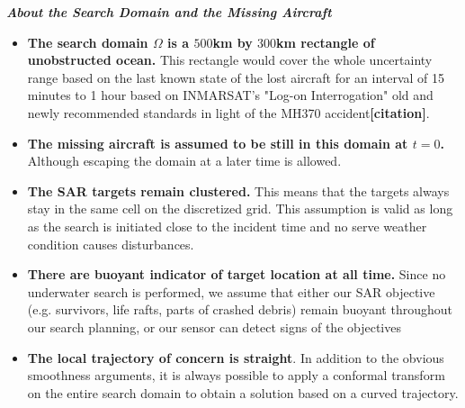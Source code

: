 \documentclass[12pt, letterpaper]{article}  %
\theoremstyle{definition}
\theoremstyle{remark}
\theoremstyle{plain}
\begin{document}
\textit{\textbf{About the Search Domain and the Missing Aircraft}}
\begin{itemize}
\item \textbf{The search domain $\Omega$ is a $500$km by $300$km rectangle of unobstructed ocean.} This rectangle would cover the whole uncertainty range based on 
the last known state of the lost aircraft for an interval of 15 minutes to 1 hour based on INMARSAT's "Log-on Interrogation" old and newly recommended standards in light of the MH370 accident\textbf{[citation]}.
\item \textbf{The missing aircraft is assumed to be still in this domain at $t=0$.} Although escaping the domain at a later time is allowed.
\item \textbf{The SAR targets remain clustered.} This means that the targets always stay in the same cell on the discretized grid. This assumption is valid as long as the search is initiated close to the incident time and no serve weather condition causes disturbances.
\item \textbf{There are buoyant indicator of target location at all time.} Since no underwater search is performed, we assume that either our SAR objective (e.g. survivors, life rafts, parts of crashed debris) remain buoyant throughout our search planning, or our sensor can detect signs of the objectives 
\item \textbf{The local trajectory of concern is straight}. In addition to the obvious smoothness arguments, it is always possible to apply a conformal transform on the entire search domain to obtain a solution based on a curved trajectory.


\end{itemize}
\end{document}
